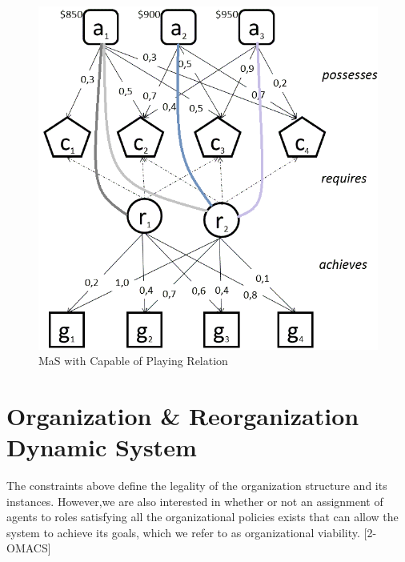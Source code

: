 \begin{figure}[th]
	\centering
		\includegraphics{chapiter1/img/mag}
	\caption{\label{fig:Capable Of playing Relation} MaS with Capable of Playing Relation}
\end{figure}

































\section{ Organization \& Reorganization Dynamic System}
 
The constraints above define the legality of the organization structure and its instances.  However,we are also interested in whether or not an assignment of agents to roles satisfying all the organizational policies exists that can allow the system to achieve its goals, which we refer to as organizational viability. [2-OMACS]


